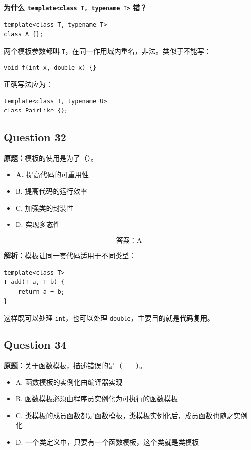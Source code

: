 \documentclass[11pt, a4paper]{article}
\begin{document}
\textbf{为什么 \texttt{template<class T, typename T>} 错？}
\begin{lstlisting}
template<class T, typename T>
class A {};
\end{lstlisting}
两个模板参数都叫 \texttt{T}，在同一作用域内重名，非法。类似于不能写：
\begin{lstlisting}
void f(int x, double x) {}
\end{lstlisting}

正确写法应为：
\begin{lstlisting}
template<class T, typename U>
class PairLike {};
\end{lstlisting}


\subsection*{Question 32}
\textbf{原题：}模板的使用是为了（）。
\begin{itemize}
    \item \textbf{A.} 提高代码的可重用性
    \item B. 提高代码的运行效率
    \item C. 加强类的封装性
    \item D. 实现多态性
\end{itemize}

\[
\boxed{\text{答案：A}}
\]

\textbf{解析：}模板让同一套代码适用于不同类型：
\begin{lstlisting}
template<class T>
T add(T a, T b) {
    return a + b;
}
\end{lstlisting}
这样既可以处理 \texttt{int}，也可以处理 \texttt{double}，主要目的就是\textbf{代码复用}。


\subsection*{Question 34}
\textbf{原题：}关于函数模板，描述错误的是（~~~~）。
\begin{itemize}
    \item A. 函数模板的实例化由编译器实现
    \item B. 函数模板必须由程序员实例化为可执行的函数模板
    \item C. 类模板的成员函数都是函数模板，类模板实例化后，成员函数也随之实例化
    \item D. 一个类定义中，只要有一个函数模板，这个类就是类模板
\end{itemize}
\end{document}
